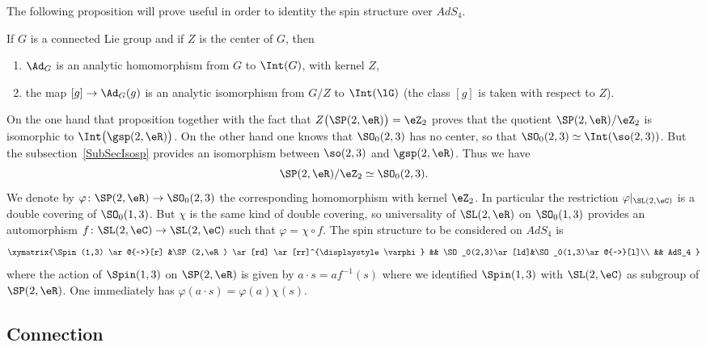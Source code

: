 The following proposition will prove useful in order to identity the spin structure over $AdS_4$.

\begin{proposition}
If $G$ is a connected Lie group and if $Z$ is the center of $G$, then
\begin{enumerate}
\item $\Ad_G$ is an analytic homomorphism from $G$ to $\Int(G)$, with kernel $Z$,
\item the map $[g]\to\Ad_G(g)$ is an analytic isomorphism from $G/Z$ to $\Int(\lG)$ (the class $[g]$ is taken with respect to $Z$).
\end{enumerate}
\end{proposition}
On the one hand that proposition together with the fact that $Z\big( \SP(2,\eR) \big)=\eZ_2$ proves that the quotient $\SP(2,\eR)/\eZ_2$ is isomorphic to $\Int\big(\gsp(2,\eR)\big)$. On the other hand one knows that $\SO_0(2,3)$ has no center, so that $\SO_0(2,3)\simeq\Int(\so(2,3))$. But the subsection~\ref{SubSecIsosp} provides an isomorphism between $\so(2,3)$ and $\gsp(2,\eR)$. Thus we have
\begin{equation}
\SP(2,\eR)/\eZ_2\simeq \SO_0(2,3).
\end{equation}
We denote by $\varphi\colon \SP(2,\eR)\to \SO_0(2,3)$ the corresponding homomorphism with kernel $\eZ_2$. In particular the restriction $\varphi|_{\SL(2,\eC)}$ is a double covering of $\SO_0(1,3)$. But $\chi$ is the same kind of double covering, so universality of $\SL(2,\eR)$ on $\SO_0(1,3)$ provides an automorphism $f\colon \SL(2,\eC)\to \SL(2,\eC)$ such that $\varphi=\chi\circ f$. The spin structure to be considered on $AdS_4$ is
\[
\xymatrix{%
   \Spin(1,3) \ar@{~>}[r]       &\SP(2,\eR)  \ar[rd] \ar[rr]^{\displaystyle\varphi} &&  \SO_0(2,3)\ar[ld]&\SO_0(1,3)\ar@{~>}[l]\\
   &&   AdS_4
}
\]
where the action of $\Spin(1,3)$ on $\SP(2,\eR)$ is given by $a\cdot s=af^{-1}(s)$ where we identified $\Spin(1,3)$ with $\SL(2,\eC)$ as subgroup of $\SP(2,\eR)$. One immediately has $\varphi(a\cdot s)=\varphi(a)\chi(s)$.


\subsection{Connection}

